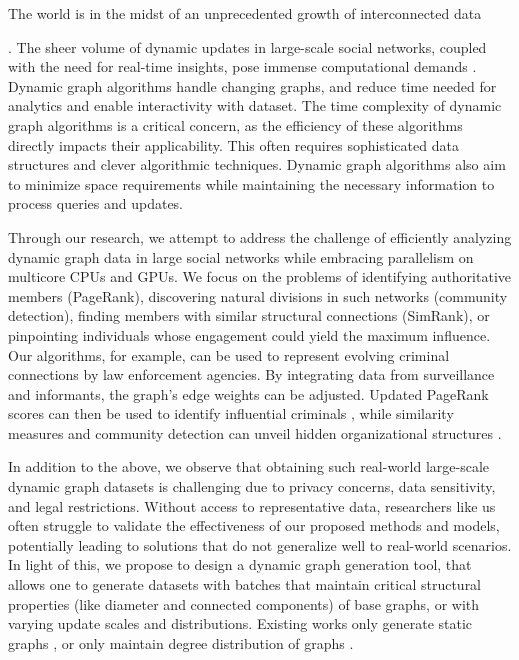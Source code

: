 {The world is in the midst of an unprecedented growth of interconnected data \cite{graph-sakr21}. The sheer volume of dynamic updates in large-scale social networks, coupled with the need for real-time insights, pose immense computational demands \cite{graph-gebreegziabher23, graph-lloyd21}. Dynamic graph algorithms handle changing graphs, and reduce time needed for analytics and enable interactivity with dataset. The time complexity of dynamic graph algorithms is a critical concern, as the efficiency of these algorithms directly impacts their applicability. This often requires sophisticated data structures and clever algorithmic techniques. Dynamic graph algorithms also aim to minimize space requirements while maintaining the necessary information to process queries and updates.

\vspace{-3ex}
Through our research, we attempt to address the challenge of efficiently analyzing dynamic graph data in large social networks while embracing parallelism on multicore CPUs and GPUs. We focus on the problems of identifying authoritative members (PageRank), discovering natural divisions in such networks (community detection), finding members with similar structural connections (SimRank), or pinpointing individuals whose engagement could yield the maximum influence. Our algorithms, for example, can be used to represent evolving criminal connections by law enforcement agencies. By integrating data from surveillance and informants, the graph's edge weights can be adjusted. Updated PageRank scores can then be used to identify influential criminals \cite{criminal-sarvari14}, while similarity measures and community detection can unveil hidden organizational structures \cite{criminal-bahulkar18}.

\vspace{-3ex}
In addition to the above, we observe that obtaining such real-world large-scale dynamic graph datasets is challenging due to privacy concerns, data sensitivity, and legal restrictions. Without access to representative data, researchers like us often struggle to validate the effectiveness of our proposed methods and models, potentially leading to solutions that do not generalize well to real-world scenarios. In light of this, we propose to design a dynamic graph generation tool, that allows one to generate datasets with batches that maintain critical structural properties (like diameter and connected components) of base graphs, or with varying update scales and distributions. Existing works only generate static graphs \cite{graph-leskovec07}, or only maintain degree distribution of graphs \cite{graph-mccrabb22}.}

